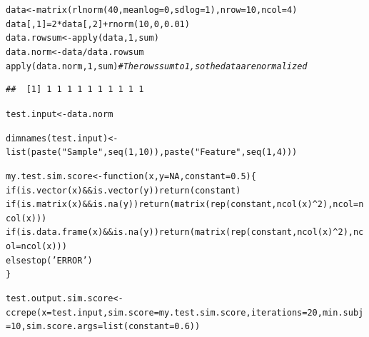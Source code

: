 \documentclass{article}\usepackage[]{graphicx}\usepackage[usenames,dvipsnames]{color}
\newcommand{\hlnum}[1]{\textcolor[rgb]{0.816,0.125,0.439}{#1}}%
\newcommand{\hlstr}[1]{\textcolor[rgb]{0.251,0.627,0.251}{#1}}%
\newcommand{\hlcom}[1]{\textcolor[rgb]{0.502,0.502,0.502}{\textit{#1}}}%
\newcommand{\hlopt}[1]{\textcolor[rgb]{0,0,0}{#1}}%
\newcommand{\hlstd}[1]{\textcolor[rgb]{0.251,0.251,0.251}{#1}}%
\newcommand{\hlkwa}[1]{\textcolor[rgb]{0.125,0.125,0.941}{#1}}%
\newcommand{\hlkwb}[1]{\textcolor[rgb]{0,0,0}{#1}}%
\newcommand{\hlkwc}[1]{\textcolor[rgb]{0.251,0.251,0.251}{#1}}%
\newcommand{\hlkwd}[1]{\textcolor[rgb]{0.878,0.439,0.125}{#1}}%
\newenvironment{knitrout}{}{} %
\begin{document}
\begin{knitrout}
\color{fgcolor}\begin{kframe}
\begin{alltt}
\hlstd{data} \hlkwb{<-} \hlkwd{matrix}\hlstd{(}\hlkwd{rlnorm}\hlstd{(}\hlnum{40}\hlstd{,}\hlkwc{meanlog}\hlstd{=}\hlnum{0}\hlstd{,}\hlkwc{sdlog}\hlstd{=}\hlnum{1}\hlstd{),}\hlkwc{nrow}\hlstd{=}\hlnum{10}\hlstd{,}\hlkwc{ncol}\hlstd{=}\hlnum{4}\hlstd{)}
\hlstd{data[,}\hlnum{1}\hlstd{]} \hlkwb{=} \hlnum{2}\hlopt{*}\hlstd{data[,}\hlnum{2}\hlstd{]} \hlopt{+} \hlkwd{rnorm}\hlstd{(}\hlnum{10}\hlstd{,}\hlnum{0}\hlstd{,}\hlnum{0.01}\hlstd{)}
\hlstd{data.rowsum} \hlkwb{<-} \hlkwd{apply}\hlstd{(data,}\hlnum{1}\hlstd{,sum)}
\hlstd{data.norm} \hlkwb{<-} \hlstd{data}\hlopt{/}\hlstd{data.rowsum}
\hlkwd{apply}\hlstd{(data.norm,}\hlnum{1}\hlstd{,sum)}  \hlcom{# The rows sum to 1, so the data are normalized}
\end{alltt}
\begin{verbatim}
##  [1] 1 1 1 1 1 1 1 1 1 1
\end{verbatim}
\begin{alltt}
\hlstd{test.input} \hlkwb{<-} \hlstd{data.norm}

\hlkwd{dimnames}\hlstd{(test.input)} \hlkwb{<-} \hlkwd{list}\hlstd{(}\hlkwd{paste}\hlstd{(}\hlstr{"Sample"}\hlstd{,}\hlkwd{seq}\hlstd{(}\hlnum{1}\hlstd{,}\hlnum{10}\hlstd{)),}\hlkwd{paste}\hlstd{(}\hlstr{"Feature"}\hlstd{,}\hlkwd{seq}\hlstd{(}\hlnum{1}\hlstd{,}\hlnum{4}\hlstd{)))}

\hlstd{my.test.sim.score} \hlkwb{<-} \hlkwa{function}\hlstd{(}\hlkwc{x}\hlstd{,}\hlkwc{y}\hlstd{=}\hlnum{NA}\hlstd{,}\hlkwc{constant}\hlstd{=}\hlnum{0.5}\hlstd{)\{}
       \hlkwa{if}\hlstd{(}\hlkwd{is.vector}\hlstd{(x)} \hlopt{&&} \hlkwd{is.vector}\hlstd{(y))} \hlkwd{return}\hlstd{(constant)}
          \hlkwa{if}\hlstd{(}\hlkwd{is.matrix}\hlstd{(x)} \hlopt{&&} \hlkwd{is.na}\hlstd{(y))} \hlkwd{return}\hlstd{(}\hlkwd{matrix}\hlstd{(}\hlkwd{rep}\hlstd{(constant,}\hlkwd{ncol}\hlstd{(x)}\hlopt{^}\hlnum{2}\hlstd{),}\hlkwc{ncol}\hlstd{=}\hlkwd{ncol}\hlstd{(x)))}
          \hlkwa{if}\hlstd{(}\hlkwd{is.data.frame}\hlstd{(x)} \hlopt{&&} \hlkwd{is.na}\hlstd{(y))} \hlkwd{return}\hlstd{(}\hlkwd{matrix}\hlstd{(}\hlkwd{rep}\hlstd{(constant,}\hlkwd{ncol}\hlstd{(x)}\hlopt{^}\hlnum{2}\hlstd{),}\hlkwc{ncol}\hlstd{=}\hlkwd{ncol}\hlstd{(x)))}
          \hlkwa{else} \hlkwd{stop}\hlstd{(}\hlstr{'ERROR'}\hlstd{)}
   \hlstd{\}}

\hlstd{test.output.sim.score}    \hlkwb{<-} \hlkwd{ccrepe}\hlstd{(}\hlkwc{x}\hlstd{=test.input,} \hlkwc{sim.score}\hlstd{=my.test.sim.score,} \hlkwc{iterations}\hlstd{=}\hlnum{20}\hlstd{,} \hlkwc{min.subj}\hlstd{=}\hlnum{10}\hlstd{,} \hlkwc{sim.score.args} \hlstd{=} \hlkwd{list}\hlstd{(}\hlkwc{constant} \hlstd{=} \hlnum{0.6}\hlstd{))}
\end{alltt}
\end{kframe}
\end{knitrout}
\end{document}

